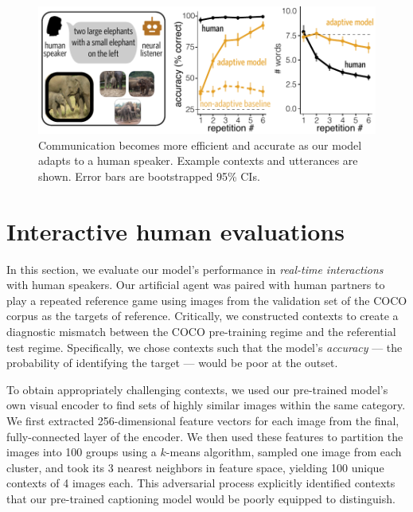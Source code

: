 \documentclass[11pt,a4paper]{article}
\begin{document}
\begin{figure}[t!]
\centering
\includegraphics[scale=1.05]{../figures/combinedResults_conll.pdf}
\caption{Communication becomes more efficient and accurate as our model adapts to a human speaker. Example contexts and utterances are shown. Error bars are bootstrapped 95\% CIs.}
\label{fig:results}
\end{figure}

\section{Interactive human evaluations}
\label{sec:evaluation}
In this section, we evaluate our model's performance  in \emph{real-time interactions} with human speakers. 
Our artificial agent was paired with human partners to play a repeated reference game using images from the validation set of the COCO corpus \cite{lin2014microsoft,chen2015microsoft} as the targets of reference.
Critically, we constructed contexts to create a diagnostic mismatch between the COCO pre-training regime and the referential test regime. 
Specifically, we chose contexts such that the model's \emph{accuracy} --- the probability of identifying the target --- would be poor at the outset. 

To obtain appropriately challenging contexts, we used our pre-trained model's own visual encoder to find sets of highly similar images within the same category.
We first extracted 256-dimensional feature vectors for each image from the final, fully-connected layer of the encoder. 
We then used these features to partition the images into 100 groups using a $k$-means algorithm, sampled one image from each cluster, and took its 3 nearest neighbors in feature space, yielding 100 unique contexts of 4 images each. 
This adversarial process explicitly identified contexts that our pre-trained captioning model would be poorly equipped to distinguish. 
\end{document}
